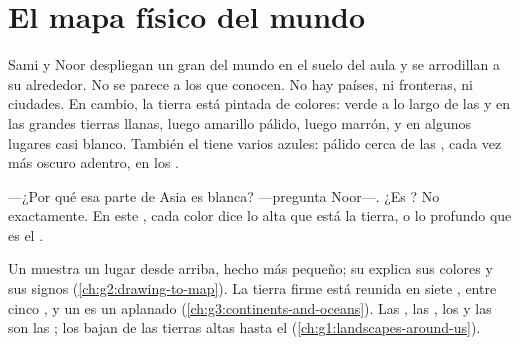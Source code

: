 \chapter{El mapa físico del mundo}\label{ch:g4:world-physical-map}

Sami y Noor despliegan un gran  del mundo en el suelo del aula y se
arrodillan a su alrededor. No se parece a los  que conocen. No hay
países, ni fronteras, ni ciudades. En cambio, la tierra está pintada de
colores: verde a lo largo de las  y en las grandes tierras llanas,
luego amarillo pálido, luego marrón, y en algunos lugares casi blanco.
También el  tiene varios azules: pálido cerca de las , cada vez más
oscuro  adentro, en los .

---¿Por qué esa parte de Asia es blanca? ---pregunta Noor---. ¿Es ?
No exactamente. En este , cada color dice lo alta que está la tierra, o
lo profundo que es el .

\begin{recall}
Un  muestra un lugar desde arriba, hecho más pequeño; su 
explica sus colores y sus signos (\cref{ch:g2:drawing-to-map}). La tierra
firme está reunida en siete , entre cinco , y un 
es un  aplanado (\cref{ch:g3:continents-and-oceans}). Las , las
, los  y las  son las ; los 
bajan de las tierras altas hasta el  (\cref{ch:g1:landscapes-around-us}).
\end{recall}


